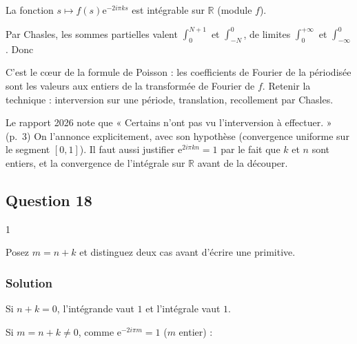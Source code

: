 \documentclass[11pt,a4paper]{article}
\newcommand{\equationajustee}[1]{%
  \sbox{\boiteequation}{$\displaystyle #1$}%
  \ifdim\wd\boiteequation>\linewidth
    \[\resizebox{\linewidth}{!}{\usebox{\boiteequation}}\]%
  \else
    \[#1\]%
  \fi}
\begin{document}
La fonction \(s\mapsto f(s){\mathrm{e}}^{-2i\pi ks}\) est intégrable sur \(\mathbb{R}\) (module \(f\)).

Par Chasles, les sommes partielles valent \(\int_0^{N+1}\) et \(\int_{-N}^0\), de limites \(\int_0^{+\infty}\) et \(\int_{-\infty}^0\). Donc

\equationajustee{\boxed{\forall k\in\mathbb{Z},\quad c_k(F)=\int_{-\infty}^{+\infty}f(t)\,{\mathrm{e}}^{-2i\pi kt}\,\mathrm{d}t.}}

\begin{methode}

C'est le cœur de la formule de Poisson : les coefficients de Fourier de la périodisée sont les valeurs aux entiers de la transformée de Fourier de \(f\). Retenir la technique : interversion sur une période, translation, recollement par Chasles.

\end{methode}

\begin{jury}

Le rapport 2026 note que « Certains n'ont pas vu l'interversion à effectuer. » (p.~3) On l'annonce explicitement, avec son hypothèse (convergence uniforme sur le segment \([0,1]\)). Il faut aussi justifier \({\mathrm{e}}^{2i\pi kn}=1\) par le fait que \(k\) et \(n\) sont entiers, et la convergence de l'intégrale sur \(\mathbb{R}\) avant de la découper.

\end{jury}

\hypertarget{question-18}{%
\subsection{Question 18}\label{question-18}}

\begin{indication}{1}

Posez \(m=n+k\) et distinguez deux cas avant d'écrire une primitive.

\end{indication}

\hypertarget{solution-17}{%
\subsubsection{Solution}\label{solution-17}}

Si \(n+k=0\), l'intégrande vaut \(1\) et l'intégrale vaut \(1\).

Si \(m=n+k\neq0\), comme \({\mathrm{e}}^{-2i\pi m}=1\) (\(m\) entier) :
\end{document}
